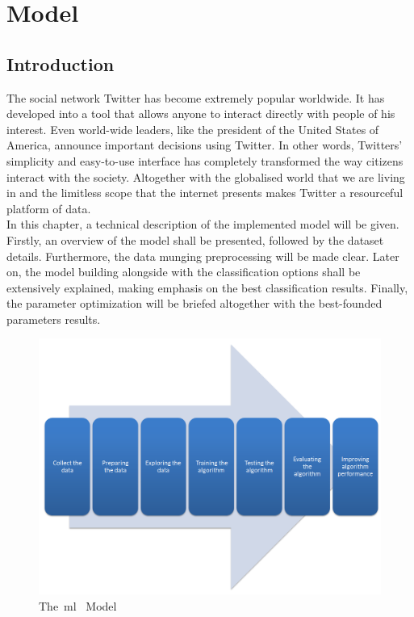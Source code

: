 \chapter{Model}
\label{chap:model}

\section{Introduction}
\label{sec:intromodel}
The social network Twitter has become extremely popular worldwide. It has developed into a tool that allows anyone to interact directly with people of his interest. Even world-wide leaders, like the president of the United States of America, announce important decisions using Twitter. In other words, Twitters' simplicity and easy-to-use interface has completely transformed the way citizens interact with the society. Altogether with the globalised world that we are living in and the limitless scope that the internet presents makes Twitter a resourceful platform of data.\\
In this chapter, a technical description of the implemented model will be given.\\
Firstly, an overview of the model shall be presented, followed by the dataset details. Furthermore, the data munging preprocessing will be made clear. Later on, the model building alongside with the classification options shall be extensively explained, making emphasis on the best classification results. Finally, the parameter optimization will be briefed altogether with the best-founded parameters results.
\begin{figure}
	\centering
	\includegraphics[scale=1.65]{img/model.png}
	\caption{The~\acl{ml}~\cite{model} Model}
	\label{fig:model}
\end{figure}
\par
